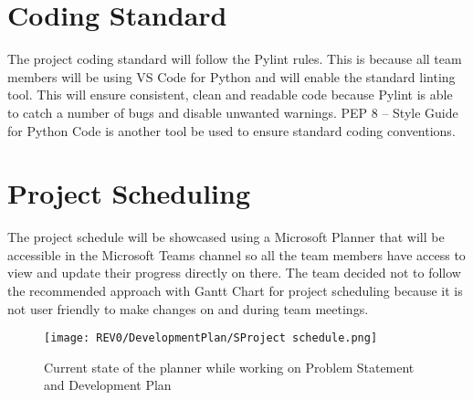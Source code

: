 \documentclass{article}
\begin{document}
\section{Coding Standard}
The project coding standard will follow the Pylint rules. This is because all team members will be using VS Code for Python and will enable the standard linting tool. This will ensure consistent, clean and readable code because Pylint is able to catch a number of bugs and disable unwanted warnings. %
PEP 8 – Style Guide for Python Code is another tool be used to ensure standard coding conventions. %

\section{Project Scheduling} %
The project schedule will be showcased using a Microsoft Planner that will be accessible in the Microsoft Teams channel so all the team members have access to view and update their progress directly on there. The team decided not to follow the recommended approach with Gantt Chart for project scheduling because it is not user friendly to make changes on and during team meetings.
\begin{figure}[h]
\caption{Current state of the planner while working on Problem Statement and Development Plan}
\centering
\texttt{[image: REV0/DevelopmentPlan/SProject schedule.png]}
\end{figure}
\end{document}
